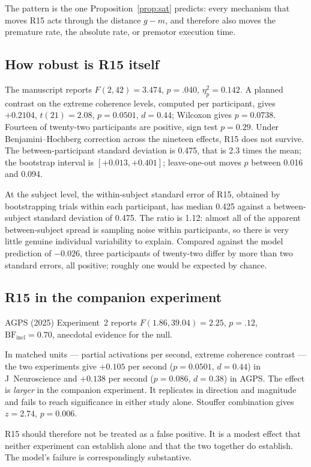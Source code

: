 \documentclass[11pt,a4paper]{article}
\theoremstyle{plain}
\theoremstyle{remark}
\begin{document}
The pattern is the one Proposition~\ref{prop:sat} predicts: every mechanism that moves R15
acts through the distance $g-m$, and therefore also moves the premature rate, the absolute
rate, or premotor execution time.

\subsection{How robust is R15 itself}

The manuscript reports $F(2,42)=3.474$, $p=.040$, $\eta_p^2=0.142$. A planned contrast on
the extreme coherence levels, computed per participant, gives $+0.2104$, $t(21)=2.08$,
$p=0.0501$, $d=0.44$; Wilcoxon gives $p=0.0738$. Fourteen of twenty-two participants are
positive, sign test $p=0.29$. Under Benjamini--Hochberg correction across the nineteen
effects, R15 does not survive. The between-participant standard deviation is 0.475, that is
2.3 times the mean; the bootstrap interval is $[+0.013,+0.401]$; leave-one-out moves $p$
between 0.016 and 0.094.

At the subject level, the within-subject standard error of R15, obtained by bootstrapping
trials within each participant, has median 0.425 against a between-subject standard
deviation of 0.475. The ratio is 1.12: almost all of the apparent between-subject spread is
sampling noise within participants, so there is very little genuine individual variability
to explain. Compared against the model prediction of $-0.026$, three participants of
twenty-two differ by more than two standard errors, all positive; roughly one would be
expected by chance.

\subsection{R15 in the companion experiment}

AGPS (2025) Experiment~2 reports $F(1.86,39.04)=2.25$, $p=.12$,
$\mathrm{BF}_{\text{incl}}=0.70$, anecdotal evidence for the null.

In matched units --- partial activations per second, extreme coherence contrast --- the two
experiments give $+0.105$ per second ($p=0.0501$, $d=0.44$) in J~Neuroscience and $+0.138$
per second ($p=0.086$, $d=0.38$) in AGPS. The effect is \emph{larger} in the companion
experiment. It replicates in direction and magnitude and fails to reach significance in
either study alone. Stouffer combination gives $z=2.74$, $p=0.006$.

R15 should therefore not be treated as a false positive. It is a modest effect that neither
experiment can establish alone and that the two together do establish. The model's failure
is correspondingly substantive.
\end{document}
